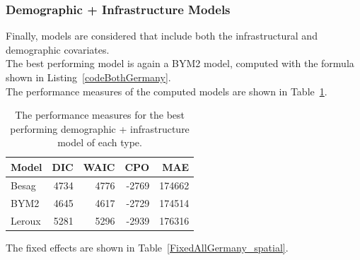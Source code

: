 \subsubsection{Demographic + Infrastructure Models}
Finally, models are considered that include both the infrastructural and demographic covariates. \\
The best performing model is again a BYM2 model, computed with the formula shown in Listing~\ref{codeBothGermany}. \\
The performance measures of the computed models are shown in Table~\ref{allGermany}.
\begin{table}[H] 
\caption{The performance measures for the best performing demographic + infrastructure model of each type. \label{allGermany}}
\begin{tabular}{l r r r r}
\toprule
\textbf{Model}	& \textbf{DIC}	& \textbf{WAIC} & \textbf{CPO} & \textbf{MAE}\\
\midrule
Besag&  4734 & 4776 & -2769 & 174662\\
BYM2 & 4645 & 4617 & -2729 & 174514\\
Leroux & 5281 & 5296 & -2939 & 176316 \\
\bottomrule
\end{tabular}
\end{table}
The fixed effects are shown in Table~\ref{FixedAllGermany_spatial}.
